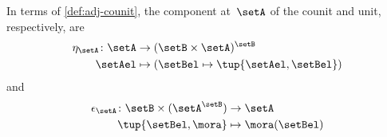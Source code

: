 In terms of \cref{def:adj-counit}, the component at~$\setA$ of the counit and unit, respectively, are
\begin{equation*}
    \begin{aligned}
        \eta_\setA \colon \setA &\to  (\setB \times \setA)^\setB\\
        \setAel &\mapsto (\setBel \mapsto \tup{\setAel,\setBel})
    \end{aligned}
\end{equation*}
and
\begin{equation*}
    \begin{aligned}
        \epsilon_\setA \colon \setB \times (\setA^\setB) &\to \setA\\
        \tup{\setBel,\mora} &\mapsto \mora(\setBel)
    \end{aligned}
\end{equation*}
